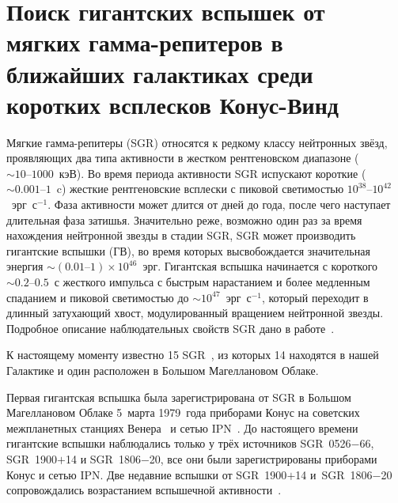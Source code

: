 \chapter{Поиск гигантских вспышек от мягких гамма-репитеров в ближайших галактиках 
         среди коротких всплесков Конус-Винд} \label{chapt4}
Мягкие гамма-репитеры (SGR) относятся к редкому классу нейтронных звёзд, проявляющих 
два типа активности в жестком рентгеновском диапазоне ($\sim 10\textrm{--}1000$~кэВ). 
Во время периода активности SGR испускают короткие ($\sim0.001\textrm{--}1$~c) жесткие рентгеновские всплески 
с пиковой светимостью $10^{38}\textrm{--}10^{42}$~эрг~с$^{-1}$. Фаза активности может длится 
от дней до года, после чего наступает длительная фаза затишья. Значительно реже, 
возможно один раз за время нахождения нейтронной звезды в стадии SGR, SGR может 
производить гигантские вспышки (ГВ), во время которых высвобождается значительная 
энергия $\sim(0.01\textrm{--}1)\times 10^{46}$~эрг. Гигантская вспышка начинается 
с короткого $\sim 0.2\textrm{--}0.5$~с жесткого импульса с быстрым нарастанием и 
более медленным спаданием и пиковой светимостью до $\sim 10^{47}$~эрг~с$^{-1}$, который переходит 
в длинный затухающий хвост, модулированный вращением нейтронной звезды. 
Подробное описание наблюдательных свойств SGR дано в работе~\citep{Mereghetti2013}.

К настоящему моменту известно 15 SGR~\citep{Olausen_Kaspi2014}, из которых 14 
находятся в нашей Галактике и один расположен в Большом Магеллановом Облаке. 

Первая гигантская вспышка была зарегистрирована от SGR в Большом Магеллановом Облаке 
5~марта 1979~года приборами Конус на советских межпланетных станциях 
Венера~\citep{Golenetskii1979SvAL, Mazets1979} 
и сетью IPN~\citep{Barat1979, Cline1980, Evans1980, Cline1982}. 
До настоящего времени гигантские вспышки наблюдались только у трёх источников 
SGR~0526$-$66, SGR~1900$+$14 и SGR~1806$-$20, все они были зарегистрированы 
приборами Конус и сетью IPN. Две недавние вспышки от SGR~1900$+$14 и~SGR~1806$-$20 
сопровождались возрастанием вспышечной активности~\citep{Mazets1999a, Frederiks2007}.

